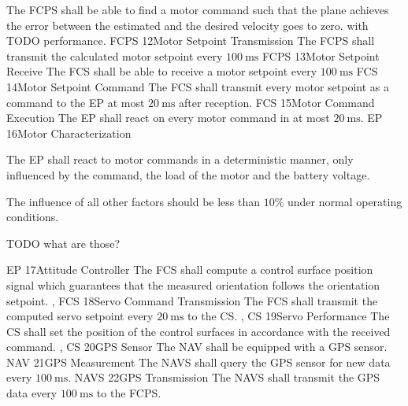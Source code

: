     {
        The FCPS shall be able to find a motor command such
        that the plane achieves the error between the estimated
        and the desired velocity goes to zero.
        with TODO performance.
    }
    {}
    {FCPS}
\req
    {12}{Motor Setpoint Transmission}
    {
        The FCPS shall transmit the calculated motor setpoint
        every $\SI{100}{\milli\second}$
    }
    {}
    {FCPS}
\req
    {13}{Motor Setpoint Receive}
    {
        The FCS shall be able to receive a motor setpoint
        every $\SI{100}{\milli\second}$
    }
    {}
    {FCS}
\req
    {14}{Motor Setpoint Command}
    {
        The FCS shall transmit every motor setpoint
        as a command to the EP at most $\SI{20}{\milli\second}$
        after reception. 
    }
    {}
    {FCS}
\req
    {15}{Motor Command Execution}
    {
        The EP shall react on every motor command in at most
        $\SI{20}{\milli\second}$.
    }
    {}
    {EP}
\req
    {16}{Motor Characterization}
    {
        The EP shall react to motor commands in a deterministic
        manner, only influenced by the command, the load of the
        motor and the battery voltage.
        
        The influence of all other factors should be less
        than $10\%$ under normal operating conditions.

        TODO what are those?
    }
    {}
    {EP}
\req
    {17}{Attitude Controller}
    {
        The FCS shall compute a control surface position signal 
        which guarantees that the measured orientation follows
        the orientation setpoint.
    }
    {, }
    {FCS}
\req
    {18}{Servo Command Transmission}
    {
        The FCS shall transmit the computed servo setpoint every
        $\SI{20}{\milli\second}$ to the CS.
    }
    {, }
    {CS}
\req
    {19}{Servo Performance}
    {
        The CS shall set the position of the control surfaces
        in accordance with the received command.
    }
    {, }
    {CS}
\req
    {20}{GPS Sensor}
    {
        The NAV shall be equipped with a GPS sensor.
    }
    {}
    {NAV}
\req
    {21}{GPS Measurement}
    {
        The NAVS shall query the GPS sensor for new data every $\SI{100}{\milli\second}$.
    }
    {}
    {NAVS}
\req
    {22}{GPS Transmission}
    {
        The NAVS shall transmit the GPS data every $\SI{100}{\milli\second}$
        to the FCPS.
    }
